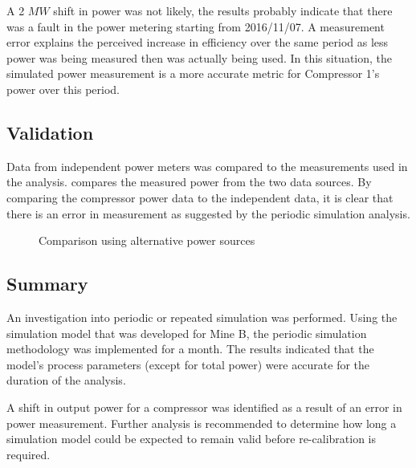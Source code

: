 A 2 $MW$ shift in power was not likely, the results probably indicate that there was a fault in the power metering starting from 2016/11/07. A measurement error explains the perceived increase in efficiency over the same period as less power was being measured then was actually being used. In this situation, the simulated power measurement is a more accurate metric for Compressor 1’s power over this period.

 \subsection{Validation}
Data from independent power meters was compared to the measurements used in the analysis.   compares the measured power from the two data sources. By comparing the compressor power data to the independent data, it is clear that there is an error in measurement as suggested by the periodic simulation analysis.
	\begin{figure}[h!]
		\centering
		
		\caption{Comparison using alternative power sources}
		\label{fig: Corrected Periodic simulation}
	\end{figure} 
	
	\subsection{Summary}
	An investigation into periodic or repeated simulation was performed. Using the simulation model that was developed for Mine B, the periodic simulation methodology was implemented for a month. The results indicated that the model's process parameters (except for total power) were accurate for the duration of the analysis.
	\par 
	 A shift in output power for a compressor  was identified as a result of an error in power measurement. Further analysis is recommended to determine how long a simulation model could be expected to remain valid before re-calibration is required.
	 
